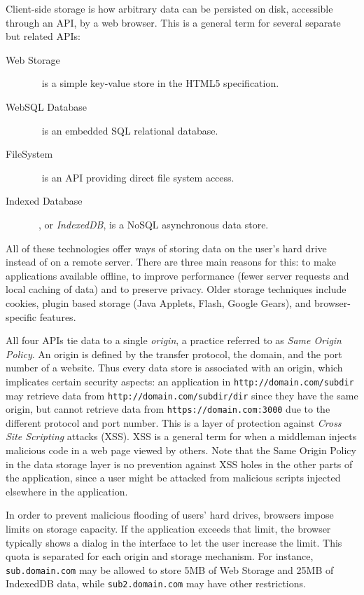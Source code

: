 Client-side storage is how arbitrary data can be persisted on disk, accessible through an API, by a web browser. This is a general term for several separate but related APIs:

\begin{description}
  \item[Web Storage]~\cite{WebStorage:Online} is a simple key-value store in the HTML5 specification.
  \item[WebSQL Database]~\cite{WebSQL:Online} is an embedded SQL relational database.
  \item[FileSystem]~\cite{FileSystem:Online} is an API providing direct file system access.
  \item[Indexed Database]~\cite{IndexedDB:Online}, or \emph{IndexedDB}, is a NoSQL asynchronous data store.
\end{description}

All of these technologies offer ways of storing data on the user's hard drive instead of on a remote server. There are three main reasons for this: to make applications available offline, to improve performance (fewer server requests and local caching of data) and to preserve privacy. Older storage techniques include cookies, plugin based storage (Java Applets, Flash, Google Gears), and browser-specific features.

All four APIs tie data to a single \emph{origin}, a practice referred to as \emph{Same Origin Policy}. An origin is defined by the transfer protocol, the domain, and the port number of a website. Thus every data store is associated with an origin, which implicates certain security aspects: an application in \texttt{http://domain.com/subdir} may retrieve data from \texttt{http://domain.com/subdir/dir} since they have the same origin, but cannot retrieve data from \texttt{https://domain.com:3000} due to the different protocol and port number. This is a layer of protection against \emph{Cross Site Scripting} attacks (XSS). XSS is a general term for when a middleman injects malicious code in a web page viewed by others. Note that the Same Origin Policy in the data storage layer is no prevention against XSS holes in the other parts of the application, since a user might be attacked from malicious scripts injected elsewhere in the application.

In order to prevent malicious flooding of users' hard drives, browsers impose limits on storage capacity. If the application exceeds that limit, the browser typically shows a dialog in the interface to let the user increase the limit. This quota is separated for each origin and storage mechanism. For instance, \texttt{sub.domain.com} may be allowed to store 5MB of Web Storage and 25MB of IndexedDB data, while \texttt{sub2.domain.com} may have other restrictions.

